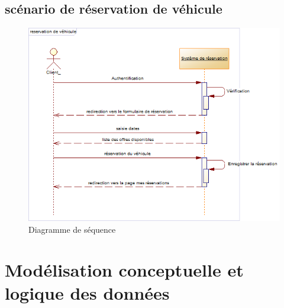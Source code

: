 \documentclass[12pt,a4paper]{report}
\begin{document}
			\subsection{scénario de réservation de véhicule}
			\vspace{1cm}
			\begin{figure}[!hbtp]
				\centering
				\includegraphics[scale=0.8]{./graphics/sequence.png}
				\caption{Diagramme de séquence}
			\end{figure}

			\newpage
			
		

		\section{Modélisation conceptuelle et logique des données}
\end{document}
